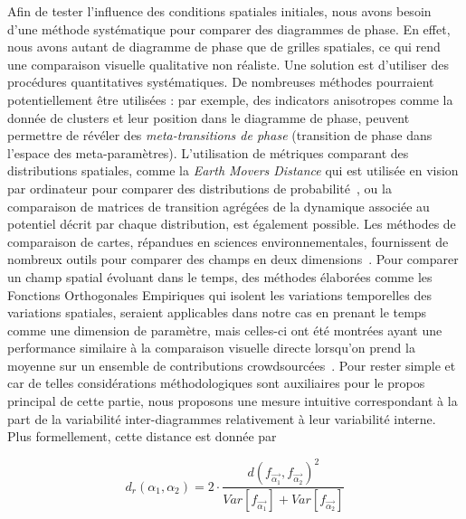 {Afin de tester l'influence des conditions spatiales initiales, nous avons besoin d'une méthode systématique pour comparer des diagrammes de phase. En effet, nous avons autant de diagramme de phase que de grilles spatiales, ce qui rend une comparaison visuelle qualitative non réaliste. Une solution est d'utiliser des procédures quantitatives systématiques. De nombreuses méthodes pourraient potentiellement être utilisées : par exemple, des indicators anisotropes comme la donnée de clusters et leur position dans le diagramme de phase, peuvent permettre de révéler des \emph{meta-transitions de phase} (transition de phase dans l'espace des meta-paramètres). L'utilisation de métriques comparant des distributions spatiales, comme la \emph{Earth Movers Distance} qui est utilisée en vision par ordinateur pour comparer des distributions de probabilité~\cite{rubner2000earth}, ou la comparaison de matrices de transition agrégées de la dynamique associée au potentiel décrit par chaque distribution, est également possible. Les méthodes de comparaison de cartes, répandues en sciences environnementales, fournissent de nombreux outils pour comparer des champs en deux dimensions~\cite{visser2006map}. Pour comparer un champ spatial évoluant dans le temps, des méthodes élaborées comme les Fonctions Orthogonales Empiriques qui isolent les variations temporelles des variations spatiales, seraient applicables dans notre cas en prenant le temps comme une dimension de paramètre, mais celles-ci ont été montrées ayant une performance similaire à la comparaison visuelle directe lorsqu'on prend la moyenne sur un ensemble de contributions crowdsourcées~\cite{10.1371/journal.pone.0178165}. Pour rester simple et car de telles considérations méthodologiques sont auxiliaires pour le propos principal de cette partie, nous proposons une mesure intuitive correspondant à la part de la variabilité inter-diagrammes relativement à leur variabilité interne. Plus formellement, cette distance est donnée par
}

\begin{equation}\label{eq:phase-distance}
d_r\left(\alpha_1,\alpha_2\right) = 2 \cdot \frac{d(f_{\vec{\alpha_1}},f_{\vec{\alpha_2}})^2}{Var\left[f_{\vec{\alpha_1}}\right] + Var\left[f_{\vec{\alpha_2}}\right]}
\end{equation}

